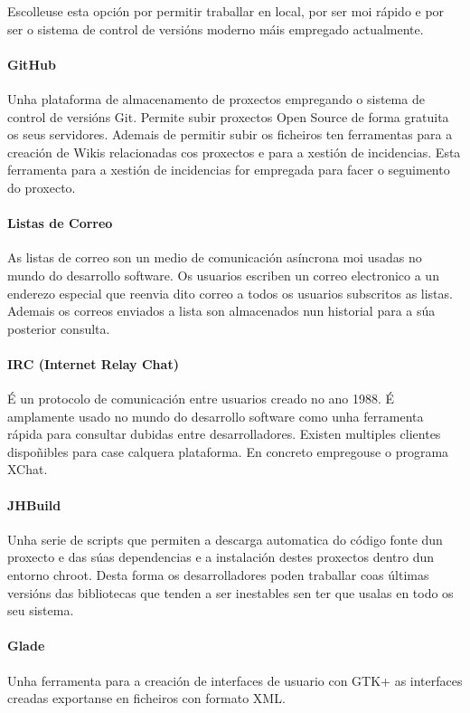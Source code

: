 Escolleuse esta opción por permitir traballar en local, por ser moi rápido e por ser o sistema de control de versións moderno máis empregado actualmente.

 \paragraph{GitHub} Unha plataforma de almacenamento de proxectos empregando o sistema de control de versións Git. Permite subir proxectos Open Source de forma gratuita os seus servidores. Ademais de permitir subir os ficheiros ten ferramentas para a creación de Wikis relacionadas cos proxectos e para a xestión de incidencias. Esta ferramenta para a xestión de incidencias for empregada para facer o seguimento do proxecto.

 \paragraph{Listas de Correo} As listas de correo son un medio de comunicación asíncrona moi usadas no mundo do desarrollo software. Os usuarios escriben un correo electronico a un enderezo especial que reenvia dito correo a todos os usuarios subscritos as listas. Ademais os correos enviados a lista son almacenados nun historial para a súa posterior consulta.


 \paragraph{IRC (Internet Relay Chat)} É un protocolo de comunicación entre usuarios creado no ano 1988. É amplamente usado no mundo do desarrollo software como unha ferramenta rápida para consultar dubidas entre desarrolladores. Existen multiples clientes dispoñibles para case calquera plataforma. En concreto empregouse o programa XChat.

 \paragraph{JHBuild} Unha serie de scripts que permiten a descarga automatica do código fonte dun proxecto e das súas dependencias e a instalación destes proxectos dentro dun entorno chroot. Desta forma os desarrolladores poden traballar coas últimas versións das bibliotecas que tenden a ser inestables sen ter que usalas en todo os seu sistema.

\paragraph{Glade} Unha ferramenta para a creación de interfaces de usuario con GTK+ as interfaces creadas exportanse en ficheiros con formato XML.

